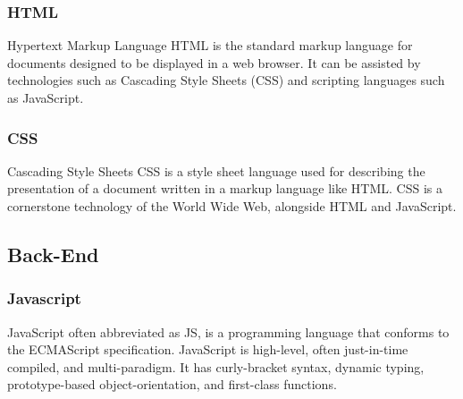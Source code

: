 \subsubsection{HTML}
Hypertext Markup Language \ac{HTML} is the standard markup language for documents designed to be displayed in a web browser. It can be assisted by technologies such as Cascading Style Sheets (CSS) and scripting languages such as JavaScript.




\subsubsection{CSS}
Cascading Style Sheets \ac{CSS} is a style sheet language used for describing the presentation of a document written in a markup language like HTML. CSS is a cornerstone technology of the World Wide Web, alongside HTML and JavaScript.



\subsection{Back-End}
\subsubsection{Javascript}
JavaScript often abbreviated as JS, is a programming language that conforms to the ECMAScript specification. JavaScript is high-level, often just-in-time compiled, and multi-paradigm. It has curly-bracket syntax, dynamic typing, prototype-based object-orientation, and first-class functions.








